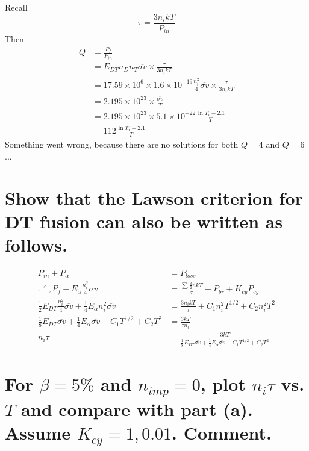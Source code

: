 \documentclass[answers]{exam}
\begin{document}
\begin{questions}
\begin{parts}
\begin{solution}
    Recall
    $$\tau = \frac{3n_ikT}{P_{in}}$$
    Then
    \begin{align*}
        Q &= \frac{P_f}{P_{in}} \\
          &= E_{DT} n_Dn_T\overline{\sigma v} \times \frac{\tau}{3n_ikT} \\
          &= 17.59 \times 10^6 \times 1.6 \times 10^{-19} \frac{n_i^2}{4} \overline{\sigma v} \times \frac{\tau}{3n_ikT} \\
          &= 2.195 \times 10^{23} \times \frac{\overline{\sigma v}}{T} \\
          &= 2.195 \times 10^{23} \times 5.1 \times 10^{-22} \frac{\ln T_i - 2.1}{T} \\
          &= 112 \frac{\ln T_i - 2.1}{T}
    \end{align*}
    Something went wrong, because there are no solutions for both $Q=4$ and $Q=6$...
\end{solution}

\part{Show that the Lawson criterion for DT fusion can also be written as follows.}

\begin{solution}
    \begin{align*}
        P_{in} + P_\alpha &= P_{loss} \\
        \frac{\varepsilon}{1-\varepsilon}P_f + E_\alpha \frac{n_i^2}{4} \overline{\sigma v} &= \frac{\sum \frac{3}{2} nkT}{\tau} + P_{br} + K_{cy}P_{cy} \\
        \frac{1}{2} E_{DT} \frac{n_i^2}{4} \overline{\sigma v} + \frac{1}{4} E_\alpha n_i^2 \overline{\sigma v} &= \frac{3n_ikT}{\tau} + C_1n_i^2T^{1/2} + C_2n_i^2T^2 \\
        \frac{1}{8} E_{DT} \overline{\sigma v} + \frac{1}{4} E_\alpha \overline{\sigma v} - C_1T^{1/2} + C_2T^2 &= \frac{3kT}{\tau n_i} \\
        n_i\tau &= \frac{3kT}{\frac{1}{8} E_{DT} \overline{\sigma v} + \frac{1}{4} E_\alpha \overline{\sigma v} - C_1T^{1/2} + C_2T^2}
    \end{align*}
\end{solution}

\part{For $\beta = 5\%$ and $n_{imp} = 0$, plot $n_i\tau$ vs. $T$ and compare with part (a). Assume $K_{cy} = 1, 0.01$. Comment.}



\end{parts}
\end{questions}
\end{document}
